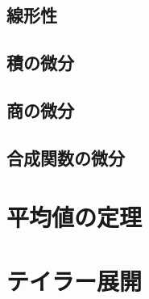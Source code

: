 \subsection{線形性}

\subsection{積の微分}

\subsection{商の微分}

\subsection{合成関数の微分}

\section{平均値の定理}

\section{テイラー展開}
